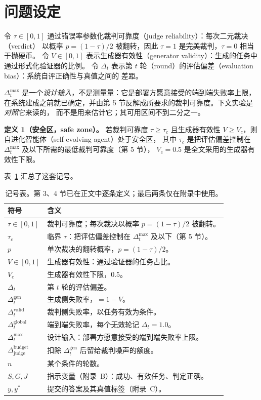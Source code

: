 \section{问题设定}

令 $\tau \in [0,1]$ 通过错误率参数化裁判可靠度（judge reliability）：每次二元裁决（verdict）
以概率 $p = (1-\tau)/2$ 被翻转，因此 $\tau = 1$ 是完美裁判，$\tau = 0$ 相当于抛硬币。
令 $V \in [0,1]$ 表示生成器有效性（generator validity）：生成的任务中通过形式化验证器的比例。
令 $\Delta_t$ 表示第 $t$ 轮（round）的评估偏差（evaluation bias）：系统自评正确性与真值之间的
差距。

$\Delta_t^{\max}$ 是一个\emph{设计输入}，不是测量量：它是部署方愿意接受的端到端失败率上限，
在系统建成之前就已确定，并由第 5 节反解成所要求的裁判可靠度。下文实验是\emph{对照}它来读的，
而不是用来估计它；其可用区间不到二分之一。

\textbf{定义 1（安全区，safe zone）。} 若裁判可靠度
$\tau \ge \tau_c$ 且生成器有效性 $V \ge V_c$，则自进化智能体（self-evolving agent）处于安全区，
其中 $\tau_c$ 是把评估偏差控制在 $\Delta_t^{\max}$ 及以下所需的最低裁判可靠度（第 5 节），
$V_c = 0.5$ 是全文采用的生成器有效性下限。

表~\ref{tab:notation} 汇总了这套记号。

\begin{table}[t]
  \centering
  \caption{记号表。第 3、4 节已在正文中逐条定义；最后两条仅在附录中使用。}
  \label{tab:notation}
  \small
  \begin{tabularx}{\textwidth}{@{}lX@{}}
    \toprule
    符号 & 含义 \\
    \midrule
    $\tau \in [0,1]$ & 裁判可靠度；每次裁决以概率 $p = (1-\tau)/2$ 被翻转。 \\
    $\tau_c$ & 临界 $\tau$：把评估偏差控制在 $\Delta_t^{\max}$ 及以下（第 5 节）。 \\
    $p$ & 单次裁决的翻转概率，$p = (1-\tau)/2$。 \\
    $V \in [0,1]$ & 生成器有效性：通过验证器的任务占比。 \\
    $V_c$ & 生成器有效性下限，$0.5$。 \\
    $\Delta_t$ & 第 $t$ 轮的评估偏差。 \\
    \midrule
    $\Delta_t^{\mathrm{gen}}$ & 生成侧失败率，$= 1 - V$。 \\
    $\Delta_t^{\mathrm{valid}}$ & 裁判侧失败率，以任务有效为条件。 \\
    $\Delta_t^{\mathrm{global}}$ & 端到端失败率，每个无效轮记 $\Delta_t = 1.0$。 \\
    $\Delta_t^{\max}$ & 设计输入：部署方愿意接受的端到端失败率上限。 \\
    $\Delta_{\mathrm{judge}}^{\mathrm{budget}}$ & 扣除 $\Delta_t^{\mathrm{gen}}$ 后留给裁判噪声的额度。 \\
    $n$ & 某个条件的轮数。 \\
    \midrule
    $S, G, J$ & 指示变量（附录~B）：成功、有效任务、判定正确。 \\
    $y, y^{*}$ & 提交的答案及其真值标签（附录~C）。 \\
    \bottomrule
  \end{tabularx}
\end{table}

